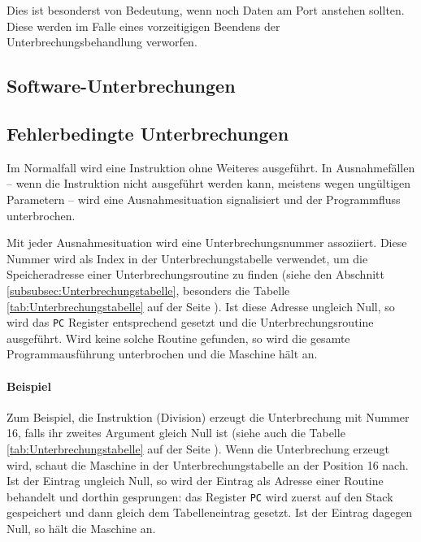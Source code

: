 Dies ist besonderst von Bedeutung, wenn noch Daten am Port anstehen sollten.
Diese werden im Falle eines vorzeitigigen Beendens der Unterbrechungsbehandlung
verworfen.

\subsection{Software-Unterbrechungen}



\subsection{Fehlerbedingte Unterbrechungen}

Im Normalfall wird eine Instruktion ohne Weiteres ausgeführt. In Ausnahmefällen
-- wenn die Instruktion nicht ausgeführt werden kann, meistens wegen ungültigen
Parametern -- wird eine Ausnahmesituation signalisiert
und der Programmfluss unterbrochen.


Mit jeder Ausnahmesituation wird eine Unterbrechungsnummer assoziiert. Diese
Nummer wird als Index in der Unterbrechungstabelle verwendet, um die
Speicheradresse einer Unterbrechungsroutine zu finden (siehe den Abschnitt
\ref{subsubsec:Unterbrechungstabelle}, besonders die Tabelle
\ref{tab:Unterbrechungstabelle} auf der Seite
\pageref{tab:Unterbrechungstabelle}). Ist diese Adresse ungleich Null, so wird
das \texttt{PC} Register entsprechend gesetzt und die Unterbrechungsroutine
ausgeführt. Wird keine solche Routine gefunden, so wird die gesamte
Programmausführung unterbrochen und die Maschine hält an.


\paragraph{Beispiel}
Zum Beispiel, die  Instruktion (Division) erzeugt die Unterbrechung
mit Nummer 16, falls ihr zweites Argument gleich Null ist (siehe auch die
Tabelle \ref{tab:Unterbrechungstabelle} auf der Seite
\pageref{tab:Unterbrechungstabelle}). Wenn die Unterbrechung erzeugt wird,
schaut die Maschine in der Unterbrechungstabelle an der Position 16 nach. Ist
der Eintrag ungleich Null, so wird der Eintrag als Adresse einer Routine
behandelt und dorthin gesprungen: das Register \texttt{PC} wird zuerst auf den
Stack gespeichert und dann gleich dem Tabelleneintrag gesetzt. Ist der Eintrag
dagegen Null, so hält die Maschine an.

